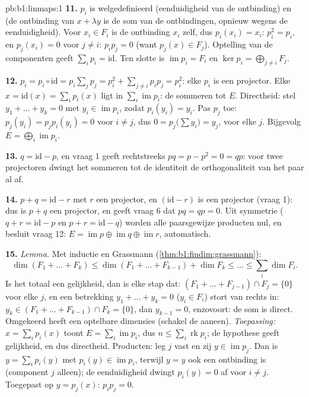\begin{solution}{pb:b1:linmaps:1}
\textbf{11.} $p_i$ is welgedefinieerd (eenduidigheid van de
ontbinding) en  (de ontbinding van $x + \lambda y$ is de som
van de ontbindingen, opnieuw wegens de eenduidigheid). Voor $x_i
\in F_i$ is de ontbinding $x_i$ zelf, dus $p_i(x_i) = x_i$: $p_i^2
= p_i$, en $p_j(x_i) = 0$ voor $j \neq i$: $p_i p_j = 0$ (want
$p_j(x) \in F_j$). Optelling van de componenten geeft $\sum_i p_i =
\mathrm{id}$. Ten slotte is $\operatorname{im} p_i = F_i$ en $\ker
p_i = \bigoplus_{j \neq i} F_j$.

\textbf{12.} $p_i = p_i \circ \mathrm{id} = p_i\sum_j p_j = p_i^2 +
\sum_{j \neq i} p_i p_j = p_i^2$: elke $p_i$ is een projector. Elke
$x = \mathrm{id}(x) = \sum_i p_i(x)$ ligt in $\sum_i
\operatorname{im} p_i$: de  sommeren tot $E$. Directheid:
stel $y_1 + \dots + y_k = 0$ met $y_i \in \operatorname{im} p_i$,
zodat $p_i(y_i) = y_i$. Pas $p_j$ toe: $p_j(y_i) = p_j p_i (y_i) =
0$ voor $i \neq j$, dus $0 = p_j\bigl(\sum y_i\bigr) = y_j$, voor
elke $j$. Bijgevolg $E = \bigoplus_i \operatorname{im} p_i$.

\textbf{13.} $q = \mathrm{id} - p$, en vraag 1 geeft rechtstreeks
$pq = p - p^2 = 0 = qp$: voor twee projectoren dwingt het sommeren
tot de identiteit de orthogonaliteit van het paar al af.

\textbf{14.} $p + q = \mathrm{id} - r$ met $r$ een projector, en
$(\mathrm{id} - r)$ is een projector (vraag 1): dus is $p + q$ een
projector, en geeft vraag 6 dat $pq = qp = 0$. Uit symmetrie ($q +
r = \mathrm{id} - p$ en $p + r = \mathrm{id} - q$) worden alle
paarsgewijze producten nul, en besluit vraag 12: $E =
\operatorname{im} p \oplus \operatorname{im} q \oplus
\operatorname{im} r$, automatisch.

\textbf{15.} \emph{Lemma.} Met inductie en Grassmann
(\cref{thm:b1:findim:grassmann}):
\[
\dim(F_1 + \dots + F_k) \leq \dim(F_1 + \dots + F_{k-1}) + \dim
F_k \leq \dots \leq \sum_i \dim F_i .
\]
Is het totaal een gelijkheid, dan is elke stap dat: $(F_1 + \dots +
F_{j-1}) \cap F_j = \{0\}$ voor elke $j$, en een betrekking $y_1 +
\dots + y_k = 0$ ($y_i \in F_i$) stort van rechts in: $y_k \in (F_1
+ \dots + F_{k-1}) \cap F_k = \{0\}$, dan $y_{k-1} = 0$,
enzovoort: de som is direct. Omgekeerd heeft een 
optelbare dimensies (schakel de  aaneen). \emph{Toepassing:}
$x = \sum_i p_i(x)$ toont $E = \sum_i \operatorname{im} p_i$, dus
$n \leq \sum_i \operatorname{rk} p_i$; de hypothese geeft
gelijkheid, en dus directheid. Producten: leg $j$ vast en zij $y
\in \operatorname{im} p_j$. Dan is $y = \sum_i p_i(y)$ met $p_i(y)
\in \operatorname{im} p_i$, terwijl $y = y$ ook een ontbinding is
(component $j$ alleen); de eenduidigheid dwingt $p_i(y) = 0$ af
voor $i \neq j$. Toegepast op $y = p_j(x)$: $p_i p_j = 0$.


\end{solution}
